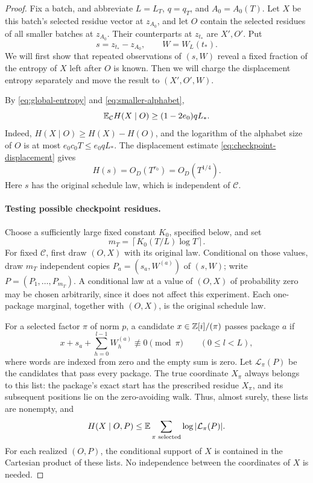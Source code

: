 \begin{proof}
Fix a batch, and abbreviate \(L=L_T\), \(q=q_T\), and
\(A_0=A_0(T)\). Let \(X\) be this batch's selected residue vector
at \(z_{A_0}\), and let \(O\) contain the selected residues of all
smaller batches at \(z_{A_0}\). Their counterparts at \(z_{t_*}\)
are \(X',O'\). Put
\[
 s=z_{t_*}-z_{A_0},\qquad W=W_L(t_*).
\]
We will first show that repeated observations of \((s,W)\) reveal a
fixed fraction of the entropy of \(X\) left after \(O\) is known.
Then we will charge the displacement entropy separately and move the
result to \((X',O',W)\).

By \eqref{eq:global-entropy} and \eqref{eq:smaller-alphabet},
\begin{equation}
 \mathbb E_{\mathcal C}H(X\mid O)\ge(1-2e_0)qL_*.
 \label{eq:initial-conditional-entropy}
\end{equation}
Indeed, \(H(X\mid O)\ge H(X)-H(O)\), and the logarithm of the
alphabet size of \(O\) is at most
\(e_0c_0T\le e_0qL_*\). The displacement estimate
\eqref{eq:checkpoint-displacement} gives
\begin{equation}
 H(s)=O_D(T^{r_0})=O_D(T^{1/4}).
 \label{eq:package-shift-entropy}
\end{equation}
Here \(s\) has the original schedule law, which is independent of
\(\mathcal C\).

\paragraph{Testing possible checkpoint residues.}
Choose a sufficiently large fixed constant \(K_0\), specified below,
and set
\[
 m_T=\left\lceil K_0(T/L)\log T\right\rceil.
\]
For fixed \(\mathcal C\), first draw \((O,X)\) with its original
law. Conditional on those values, draw \(m_T\) independent copies
\(P_a=(s_a,W^{(a)})\) of \((s,W)\); write
\(P=(P_1,\ldots,P_{m_T})\). A conditional law at a value of
\((O,X)\) of probability zero may be chosen arbitrarily, since it
does not affect this experiment. Each one-package marginal, together
with \((O,X)\), is the original schedule law.

For a selected factor \(\pi\) of norm \(p\), a candidate
\(x\in\mathbb Z[i]/(\pi)\) passes package \(a\) if
\[
 x+s_a+\sum_{h=0}^{l-1}W^{(a)}_h\not\equiv0\pmod\pi
 \qquad(0\le l<L),
\]
where words are indexed from zero and the empty sum is zero.
Let \(\mathcal L_\pi(P)\) be the candidates that pass every
package. The true coordinate \(X_\pi\) always belongs to this
list: the package's exact start has the prescribed residue \(X_\pi\),
and its subsequent positions lie on the zero-avoiding walk. Thus,
almost surely, these lists are nonempty, and
\begin{equation}
 H(X\mid O,P)
 \le \mathbb E\sum_{\pi\text{ selected}}\log|\mathcal L_\pi(P)|.
 \label{eq:passing-list-entropy}
\end{equation}
For each realized \((O,P)\), the conditional support of \(X\) is
contained in the Cartesian product of these lists. No independence
between the coordinates of \(X\) is needed.


\end{proof}
